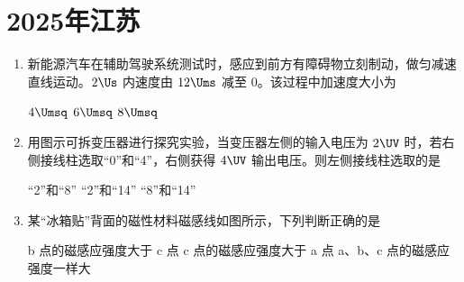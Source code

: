 \documentclass[\gkver]{gaokaozhenti}
\begin{document}
\chapter{2025年江苏}

\begin{enumerate}
\item
新能源汽车在辅助驾驶系统测试时，感应到前方有障碍物立刻制动，做匀减速直线运动。$2\Us$ 内速度由 $12\Ums$ 减至 0。该过程中加速度大小为

\fourchoices[answer=C]
{$2 \Umsq$}
{$4 \Umsq$}
{$6 \Umsq$}
{$8 \Umsq$}


\item
用图示可拆变压器进行探究实验，当变压器左侧的输入电压为 $2\UV$ 时，若右侧接线柱选取“0”和“4”，右侧获得 $4\UV$ 输出电压。则左侧接线柱选取的是


{“2”和“8”}
{“2”和“14”}
{“8”和“14”}


\item
某“冰箱贴”背面的磁性材料磁感线如图所示，下列判断正确的是


{b 点的磁感应强度大于 c 点}
{c 点的磁感应强度大于 a 点}
{a、b、c 点的磁感应强度一样大}


\end{enumerate}
\end{document}
